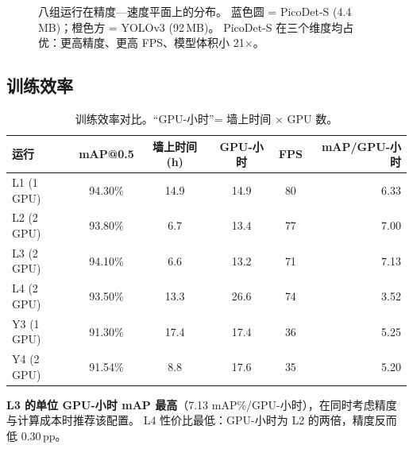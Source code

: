 \begin{figure}[H]
\caption{八组运行在精度—速度平面上的分布。
  蓝色圆 = PicoDet-S (4.4\,MB)；橙色方 = YOLOv3 (92\,MB)。
  PicoDet-S 在三个维度均占优：更高精度、更高 FPS、模型体积小 21$\times$。}
\label{fig:bubble}
\end{figure}

\subsection{训练效率}

\begin{table}[H]
\centering
\caption{训练效率对比。``GPU-小时''= 墙上时间 $\times$ GPU 数。}
\label{tab:efficiency}
\begin{tabular}{lccccr}
\toprule
\textbf{运行} & \textbf{mAP@0.5} & \textbf{墙上时间 (h)}
             & \textbf{GPU-小时} & \textbf{FPS}
             & \textbf{mAP/GPU-小时} \\
\midrule
L1 (1 GPU) & 94.30\% & 14.9 & 14.9 & 80 & 6.33 \\
L2 (2 GPU) & 93.80\% &  6.7 & 13.4 & 77 & 7.00 \\
L3 (2 GPU) & 94.10\% &  6.6 & 13.2 & 71 & 7.13 \\
L4 (2 GPU) & 93.50\% & 13.3 & 26.6 & 74 & 3.52 \\
\midrule
Y3 (1 GPU) & 91.30\% & 17.4 & 17.4 & 36 & 5.25 \\
Y4 (2 GPU) & 91.54\% &  8.8 & 17.6 & 35 & 5.20 \\
\bottomrule
\end{tabular}
\end{table}

\textbf{L3 的单位 GPU-小时 mAP 最高}（7.13 mAP\%/GPU-小时），在同时考虑精度与计算成本时推荐该配置。
L4 性价比最低：GPU-小时为 L2 的两倍，精度反而低 0.30\,pp。
